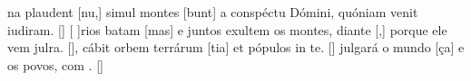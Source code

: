 {  %
  {na plaudent [nu,] simul montes [\-bunt] a conspéctu Dómini, quóniam venit iudi\-ram. [\LinkLA]}%
    {[ ]{ri}os batam [mas] e juntos exultem os montes, diante [,] porque ele vem julra. [\LinkPT]},
  {cábit orbem terrárum [tia] et pópulos in te. [\LinkLA]}%
    { julgará o mundo [ça] e os povos, com . [\LinkPT]}
}
